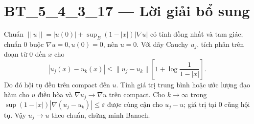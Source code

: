 \documentclass[10pt,a4paper]{article}
\begin{document}
\section*{BT\_5\_4\_3\_17 — Lời giải bổ sung}
Chuẩn $\|u\|=|u(0)|+\sup_B(1-|x|)|\nabla u|$ có tính đồng nhất và tam giác; chuẩn 0 buộc $\nabla u=0,u(0)=0$, nên $u=0$. Với dãy Cauchy $u_j$, tích phân trên đoạn từ 0 đến $x$ cho
\[|u_j(x)-u_k(x)|\le\|u_j-u_k\|\left[1+\log\frac1{1-|x|}\right].\]
Do đó hội tụ đều trên compact đến $u$. Tính giá trị trung bình hoặc ước lượng đạo hàm cho $u$ điều hòa và $\nabla u_j\to\nabla u$ trên compact. Cho $k\to\infty$ trong $\sup(1-|x|)|\nabla(u_j-u_k)|\le\varepsilon$ được cùng cận cho $u_j-u$; giá trị tại 0 cũng hội tụ. Vậy $u_j\to u$ theo chuẩn, chứng minh Banach.
\end{document}
